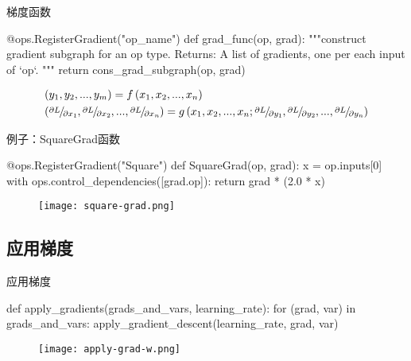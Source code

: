 \begin{frame}[fragile]{梯度函数}
  \begin{python}
@ops.RegisterGradient("op_name")
def grad_func(op, grad):
  """construct gradient subgraph for an op type.
  Returns:
    A list of gradients, one per each input of `op`.
  """
  return cons_grad_subgraph(op, grad) 
  \end{python}

\[\begin{gathered}
  \left( {{y_1},{y_2},...,{y_m}} \right) = f\left( {{x_1},{x_2},...,{x_n}} \right) \hfill \\
  \left( {{\raise0.5ex\hbox{$\scriptstyle {\partial L}$}
\kern-0.1em/\kern-0.15em
\lower0.25ex\hbox{$\scriptstyle {\partial {x_1}}$}},{\raise0.5ex\hbox{$\scriptstyle {\partial L}$}
\kern-0.1em/\kern-0.15em
\lower0.25ex\hbox{$\scriptstyle {\partial {x_2}}$}},...,{\raise0.5ex\hbox{$\scriptstyle {\partial L}$}
\kern-0.1em/\kern-0.15em
\lower0.25ex\hbox{$\scriptstyle {\partial {x_n}}$}}} \right) = g\left( {{x_1},{x_2},...,{x_n};{\raise0.5ex\hbox{$\scriptstyle {\partial L}$}
\kern-0.1em/\kern-0.15em
\lower0.25ex\hbox{$\scriptstyle {\partial {y_1}}$}},{\raise0.5ex\hbox{$\scriptstyle {\partial L}$}
\kern-0.1em/\kern-0.15em
\lower0.25ex\hbox{$\scriptstyle {\partial {y_2}}$}},...,{\raise0.5ex\hbox{$\scriptstyle {\partial L}$}
\kern-0.1em/\kern-0.15em
\lower0.25ex\hbox{$\scriptstyle {\partial {y_n}}$}}} \right) \hfill \\ 
\end{gathered} \]
\end{frame}

\begin{frame}[fragile]{例子：SquareGrad函数}
  \begin{python}
@ops.RegisterGradient("Square")
def SquareGrad(op, grad):
  x = op.inputs[0]
  with ops.control_dependencies([grad.op]):
    return grad * (2.0 * x)
  \end{python}

  \begin{figure}
    \centering
    \texttt{[image: square-grad.png]}
  \end{figure}
\end{frame}

\subsection{应用梯度}

\begin{frame}[fragile]{应用梯度}
  \begin{python} 
def apply_gradients(grads_and_vars, learning_rate):
  for (grad, var) in grads_and_vars:
    apply_gradient_descent(learning_rate, grad, var)
  \end{python}
  \begin{figure}
    \centering
    \texttt{[image: apply-grad-w.png]}
  \end{figure}  
\end{frame}

